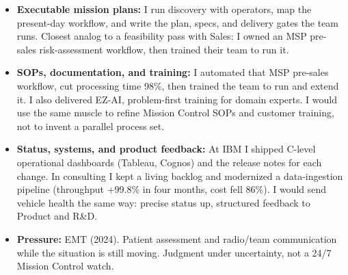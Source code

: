 \documentclass[]{cover}
\begin{document}


\currentdate{\today}




{\raggedright{}\fontsize{11pt}{13pt}\selectfont
\begin{itemize}
    \item \textbf{Executable mission plans:} I run discovery with operators, map the present-day workflow, and write the plan, specs, and delivery gates the team runs. Closest analog to a feasibility pass with Sales: I owned an MSP pre-sales risk-assessment workflow, then trained their team to run it.
    \item \textbf{SOPs, documentation, and training:} I automated that MSP pre-sales workflow, cut processing time 98\%, then trained the team to run and extend it. I also delivered EZ-AI, problem-first training for domain experts. I would use the same muscle to refine Mission Control SOPs and customer training, not to invent a parallel process set.
    \item \textbf{Status, systems, and product feedback:} At IBM I shipped C-level operational dashboards (Tableau, Cognos) and the release notes for each change. In consulting I kept a living backlog and modernized a data-ingestion pipeline (throughput +99.8\% in four months, cost fell 86\%). I would send vehicle health the same way: precise status up, structured feedback to Product and R\&D.
    \item \textbf{Pressure:} EMT (2024). Patient assessment and radio/team communication while the situation is still moving. Judgment under uncertainty, not a 24/7 Mission Control watch.
\end{itemize}\par}
\vspace{2pt}
\end{document}
